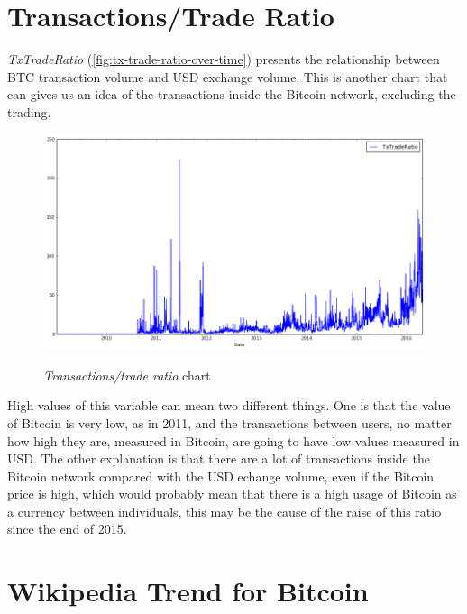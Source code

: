 
\section{Transactions/Trade Ratio}
\label{sec:tx-trade-ratio}

\textit{TxTradeRatio} (\autoref{fig:tx-trade-ratio-over-time})
presents the relationship between BTC transaction volume and USD
exchange volume. This is another chart that can gives us an idea of
the transactions inside the Bitcoin network, excluding the trading.

\begin{figure}[bth]
  \myfloatalign
  {\includegraphics[width=1\linewidth]
    {gfx/tx-trade-ratio-over-time}}
  \caption{\textit{Transactions/trade ratio} chart}
  \label{fig:tx-trade-ratio-over-time}
\end{figure}


High values of this variable can mean two different things. One is
that the value of Bitcoin is very low, as in 2011, and the
transactions between users, no matter how high they are, measured in
Bitcoin, are going to have low values measured in USD. The other
explanation is that there are a lot of transactions inside the Bitcoin
network compared with the USD echange volume, even if the Bitcoin
price is high, which would probably mean that there is a high usage of
Bitcoin as a currency between individuals, this may be the cause of
the raise of this ratio since the end of 2015.


\section{Wikipedia Trend for Bitcoin}
\label{sec:wikipedia-trend-for-bitcoin}

